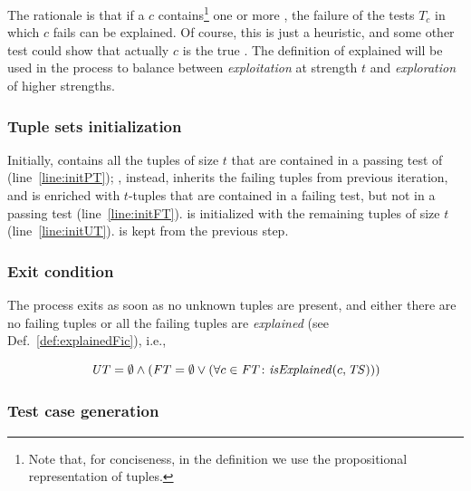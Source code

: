 \begin{tikzborder}{\cite{Gargantini16:validation}}
\begin{tikzborder}{\cite{gargantini_combinatorial_2017}}
\begin{tikzborder}{\cite{garn2019}}
\begin{tikzborder}{\cite{arcaini2019achieving}}
\begin{tikzborder}{}
The rationale is that if a \fic $c$ contains\footnote{Note that, for conciseness, in the definition we use the propositional representation of tuples.} one or more \isoMfics, the failure of the tests $T_c$ in which $c$ fails can be explained. Of course, this is just a heuristic, and some other test could show that actually $c$ is the true \mfic. The definition of explained \fic will be used in the process to balance between {\it exploitation} at strength $t$ and {\it exploration} of higher strengths.
\end{tikzborder}

\subsubsection{Tuple sets initialization}

\begin{tikzborder}{}
Initially, \pt contains all the tuples of size $t$ that are contained in a passing test of \ts (line~\ref{line:initPT}); \ft, instead, inherits the failing tuples from previous iteration, and is enriched with $t$-tuples that are contained in a failing test, but not in a passing test (line~\ref{line:initFT}). \ut is initialized with the remaining tuples of size $t$ (line~\ref{line:initUT}). \isoMficsSet is kept from the previous step.
\end{tikzborder}

\subsubsection{Exit condition}\label{sec:exitCondition}

\begin{tikzborder}{}	
The process exits as soon as no unknown tuples \ut are present, and either there are no failing tuples or all the failing tuples are {\it explained} (see Def.~\ref{def:explainedFic}), i.e.,
\end{tikzborder}
%
\begin{equation}\label{eq:exitCond}
\mathit{UT} = \emptyset \wedge (\mathit{FT}=\emptyset \vee (\forall c \in \mathit{FT} \colon \mathit{isExplained}(c, \mathit{TS})))
\end{equation}

\subsubsection{Test case generation}\label{sec:testGeneration}


\end{tikzborder}
\end{tikzborder}
\end{tikzborder}
\end{tikzborder}
